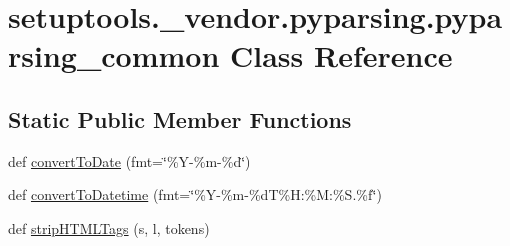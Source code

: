 \hypertarget{classsetuptools_1_1__vendor_1_1pyparsing_1_1pyparsing__common}{}\section{setuptools.\+\_\+vendor.\+pyparsing.\+pyparsing\+\_\+common Class Reference}
\label{classsetuptools_1_1__vendor_1_1pyparsing_1_1pyparsing__common}
\subsection*{Static Public Member Functions}
\begin{DoxyCompactItemize}
\item 
def \hyperlink{classsetuptools_1_1__vendor_1_1pyparsing_1_1pyparsing__common_a0ee473afab253b7d8c130f5bf2164b49}{convert\+To\+Date} (fmt=\char`\"{}\%Y-\/\%m-\/\%d\char`\"{})
\item 
def \hyperlink{classsetuptools_1_1__vendor_1_1pyparsing_1_1pyparsing__common_a9ae5cd14ba38713c5bc4523a1c81071b}{convert\+To\+Datetime} (fmt=\char`\"{}\%Y-\/\%m-\/\%dT\%H\+:\%M\+:\%S.\%f\char`\"{})
\item 
def \hyperlink{classsetuptools_1_1__vendor_1_1pyparsing_1_1pyparsing__common_a355ea204571a8f4ef1463ea0016c9403}{strip\+H\+T\+M\+L\+Tags} (s, l, tokens)
\end{DoxyCompactItemize}
